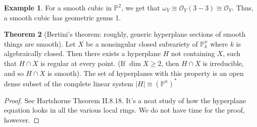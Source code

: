 \documentclass[10pt,reqno]{amsart}
\theoremstyle{definition}
\newtheorem{theorem}{Theorem}
\newtheorem{example}[theorem]{Example}
\theoremstyle{remark}
\numberwithin{equation}{section}
\numberwithin{theorem}{section}
\newcommand{\OO}{{\mathcal O}}
\newcommand{\PP}{{\mathbb P}}
\begin{document}
\begin{example}
For a smooth cubic in $\PP^2$, we get that $\omega_Y \cong \OO_Y(3-3) \cong \OO_Y$. Thus, a smooth cubic has geometric genus 1.
\end{example}

\begin{theorem}[Bertini's theorem: roughly, generic hyperplane sections of smooth things are smooth] Let $X$ be a nonsingular closed subvariety of $\PP^n_k$ where $k$ is algebraically closed. Then there exists a hyperplane $H$ not containing $X$, such that $H \cap X$ is regular at every point. (If $\dim X \ge 2$, then $H \cap X$ is irreducible, and so $H \cap X$ is smooth). The set of hyperplanes with this property is an open dense subset of the complete linear system $|H| \cong (\PP^n)^*$
\end{theorem}
\begin{proof}
See Hartshorne Theorem II.8.18. It's a neat study of how the hyperplane equation looks in all the various local rings. We do not have time for the proof, however.
\end{proof}
\end{document}
